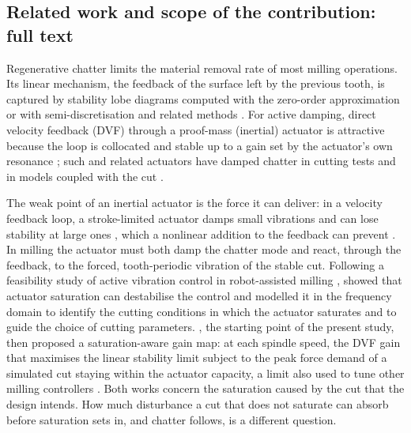
\subsection{Related work and scope of the contribution: full text}\label{supp:std-intro-review}

Regenerative chatter limits the material removal rate of most milling operations. Its linear mechanism, the feedback of the surface left by the previous tooth, is captured by stability lobe diagrams computed with the zero-order approximation \citep{altintas1995analytical} or with semi-discretisation and related methods \citep{insperger2002semi,insperger2004updated,insperger2011book} \citep[reviews:][]{quintana2011chatter,munoa2016chatter,altintas2020chatter}. For active damping, direct velocity feedback (DVF) through a proof-mass (inertial) actuator is attractive because the loop is collocated and stable up to a gain set by the actuator's own resonance \citep{elliott2001feedback}; such and related actuators have damped chatter in cutting tests and in models coupled with the cut \citep{vandijk2012robust,monnin2014optimal,dohner2004mitigation,munoa2013chatter,kleinwort2021experimental,chen2007control,mancisidor2015coupled}.

The weak point of an inertial actuator is the force it can deliver: in a velocity feedback loop, a stroke-limited actuator damps small vibrations and can lose stability at large ones \citep{baumann2007destabilization}, which a nonlinear addition to the feedback can prevent \citep{dalborgo2020active}. In milling the actuator must both damp the chatter mode and react, through the feedback, to the forced, tooth-periodic vibration of the stable cut. Following a feasibility study of active vibration control in robot-assisted milling \citep{ozsoy2022robotically}, \citet{ozsoy2025frequency} showed that actuator saturation can destabilise the control and modelled it in the frequency domain to identify the cutting conditions in which the actuator saturates and to guide the choice of cutting parameters. \citet{ozsoy2026robust}, the starting point of the present study, then proposed a saturation-aware gain map: at each spindle speed, the DVF gain that maximises the linear stability limit subject to the peak force demand of a simulated cut staying within the actuator capacity, a limit also used to tune other milling controllers \citep{soufi2026robust}. Both works concern the saturation caused by the cut that the design intends. How much disturbance a cut that does not saturate can absorb before saturation sets in, and chatter follows, is a different question.

